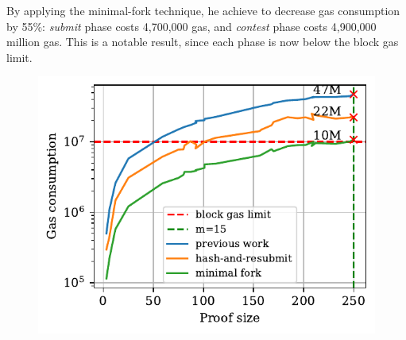 By applying the minimal-fork technique, he achieve to decrease gas consumption
by 55\%: \emph{submit} phase costs {4{,}700{,}000} gas, and \emph{contest}
phase costs {4{,}900{,}000} million gas. This is a notable result, since each
phase is now below the block gas limit.



\begin{figure}[h]
    \begin{center}
        \includegraphics[width=1\columnwidth]{figures/minimal-fork.pdf}
    \end{center}
    \caption{}
    \label{fig:minimal-fork}
\end{figure}
